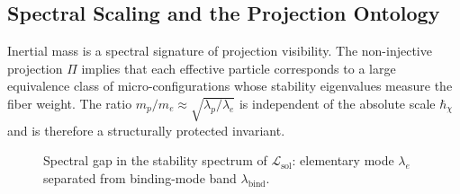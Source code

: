 \subsection{Spectral Scaling and the Projection Ontology}
\label{subsec:spectral-scaling-projection-ontology}

Inertial mass is a spectral signature of projection visibility.
The non-injective projection $\Pi$ implies that each effective particle
corresponds to a large equivalence class of micro-configurations whose
stability eigenvalues measure the fiber weight.
The ratio
$m_p/m_e \approx \sqrt{\lambda_p/\lambda_e}$
is independent of the absolute scale $\hbar_\chi$ and is
therefore a structurally protected invariant.

\begin{figure}[htbp]
  \centering
  \caption{Spectral gap in the stability spectrum of
    $\mathcal{L}_{\mathrm{sol}}$: elementary mode
    $\lambda_e$ separated from binding-mode band
    $\lambda_{\mathrm{bind}}$.}
  \label{fig:spectral-gap}
\end{figure}
